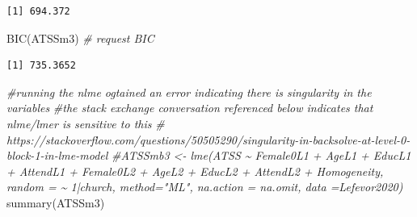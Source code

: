 \documentclass[
  11pt,
]{book}
\newenvironment{Shaded}{\begin{snugshade}}{\end{snugshade}}
\newcommand{\CommentTok}[1]{\textcolor[rgb]{0.56,0.35,0.01}{\textit{#1}}}
\newcommand{\FunctionTok}[1]{\textcolor[rgb]{0.00,0.00,0.00}{#1}}
\newcommand{\NormalTok}[1]{#1}
\begin{document}
\begin{verbatim}
[1] 694.372
\end{verbatim}

\begin{Shaded}
\begin{Highlighting}[]
\FunctionTok{BIC}\NormalTok{(ATSSm3) }\CommentTok{\# request BIC}
\end{Highlighting}
\end{Shaded}

\begin{verbatim}
[1] 735.3652
\end{verbatim}

\begin{Shaded}
\begin{Highlighting}[]
\CommentTok{\#running the nlme ogtained an error indicating there is singularity in the variables}
\CommentTok{\#the stack exchange conversation referenced below indicates that nlme/lmer is sensitive to this}
\CommentTok{\# https://stackoverflow.com/questions/50505290/singularity{-}in{-}backsolve{-}at{-}level{-}0{-}block{-}1{-}in{-}lme{-}model }
\CommentTok{\#ATSSmb3 \textless{}{-} lme(ATSS \textasciitilde{}  Female0L1 + AgeL1 + EducL1 + AttendL1 + Female0L2 + AgeL2 + EducL2 + AttendL2 + Homogeneity, random = \textasciitilde{} 1|church, method="ML", na.action = na.omit, data =Lefevor2020)}
\FunctionTok{summary}\NormalTok{(ATSSm3)}
\end{Highlighting}
\end{Shaded}
\end{document}
